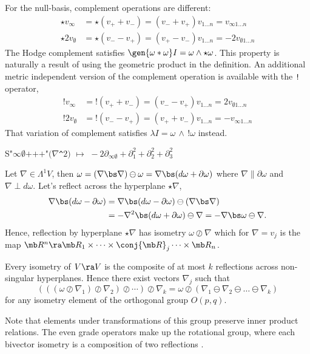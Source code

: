 \documentclass{juliacon}
\begin{document}

For the null-basis, complement operations are different:
\begin{align*}
	\star v_\infty &= \star(v_++v_-) = (v_- + v_+)v_{1...n} = v_{\infty1...n} \\
 	\star 2v_\emptyset &= \star(v_--v_+) = (v_+ - v_-)v_{1...n} = -2v_{\emptyset1...n}
\end{align*}
The Hodge complement satisfies $\gen{\omega\ast\omega}I=\omega\wedge\star\omega$. This property is naturally a result of using the geometric product in the definition.
An additional metric independent version of the complement operation is available with the \verb`!` operator,
\begin{align*}
	!v_\infty &= !(v_++v_-) = (v_- - v_+)v_{1...n} = 2v_{\emptyset1...n} \\
 	!2v_\emptyset &= !(v_--v_+) = (v_+ + v_-)v_{1...n} = -v_{\infty1...n}
\end{align*}
That variation of complement satisfies $\lambda I = \omega\,\wedge\,!\omega$ instead.
\begin{example}%
	S"$\infty\emptyset\text{+++"}(\nabla$\verb`^`$2) \,\,  \mapsto\, \, -2\partial_{\infty\emptyset} + \partial_1^2 + \partial_2^2 + \partial_3^2 $
\end{example}
Let $\nabla\in\Lambda^1V$, then $\omega = (\nabla\bs\nabla)\ominus\omega = \nabla\bs(d\omega + \partial\omega)$ where $\nabla\parallel\partial\omega$ and $\nabla\perp d\omega$.
Let's reflect across the hyperplane $\star\nabla$,
\begin{align*}
	\nabla\bs (d\omega-\partial\omega) &= \nabla\bs(d\omega-\partial\omega)\ominus(\nabla\bs\nabla) \\
									   &= -\nabla^2\bs(d\omega+\partial\omega)\ominus\nabla = -\nabla\bs\omega\ominus\nabla. %
\end{align*}
Hence, reflection by hyperplane $\star\nabla$ has isometry $\omega\oslash\nabla$ which for $\nabla = v_j$ is the map $\mb R^n \ra \mb R_1\times\cdots\times\conj{\mb R}_j\cdots\times\mb R_n$.

\begin{theorem}
	Every isometry of $V\ra V$ is the composite of at most $k$ reflections across non-singular hyperplanes. Hence there exist vectors $\nabla_j$ such that
	$$ (((\omega\oslash\nabla_1)\oslash\nabla_2)\oslash\cdots)\oslash\nabla_k = \omega\oslash(\nabla_1\ominus\nabla_2\ominus\dots\ominus\nabla_k) $$
	for any isometry element of the orthogonal group $O(p,q)$.
\end{theorem}
Note that elements under transformations of this group preserve inner product relations.
The even grade operators make up the rotational group, where each bivector isometry is a composition of two reflections \cite{artin} \cite{doran-hestenes-sommen-acker}.
\end{document}

